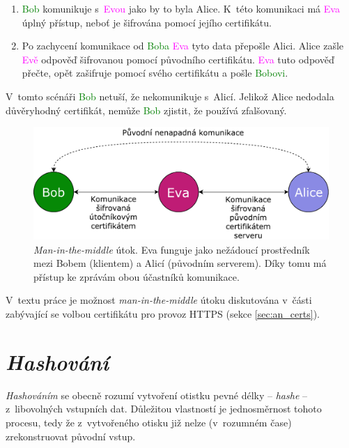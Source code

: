 \begin{enumerate}
    \item \textcolor{green}{Bob} komunikuje s~\textcolor{magenta}{Evou} jako by to byla \textcolor{blue2}{Alice}. K~této komunikaci má \textcolor{magenta}{Eva} úplný přístup, neboť je šifrována pomocí jejího certifikátu.
    \item Po zachycení komunikace od \textcolor{green}{Boba} \textcolor{magenta}{Eva} tyto data přepošle \textcolor{blue2}{Alici}. \textcolor{blue2}{Alice} zašle \textcolor{magenta}{Evě} odpověď šifrovanou pomocí původního certifikátu. \textcolor{magenta}{Eva} tuto odpověď přečte, opět zašifruje pomocí svého certifikátu a pošle \textcolor{green}{Bobovi}.
\end{enumerate}

V~tomto scénáři \textcolor{green}{Bob} netuší, že nekomunikuje s~\textcolor{blue2}{Alicí}. Jelikož \textcolor{blue2}{Alice} nedodala důvěryhodný certifikát, nemůže \textcolor{green}{Bob} zjistit, že používá zfalšovaný.

\begin{figure}[h!]
    \centering
    \includegraphics[width=\textwidth]{images/mitm.pdf}
    \caption[\textit{Man-in-the-middle} útok]{\textit{Man-in-the-middle} útok. Eva funguje jako nežádoucí prostředník mezi Bobem (klientem) a Alicí (původním serverem). Díky tomu má přístup ke zprávám obou účastníků komunikace. \cite{mitm}}
    \label{fig:mitm}
\end{figure}

V~textu práce je možnost \textit{man-in-the-middle} útoku diskutována v~části zabývající se volbou certifikátu pro provoz HTTPS (sekce \ref{sec:an_certs}).

\section{\textit{Hashování}}

\textit{Hashováním} se obecně rozumí vytvoření otistku pevné délky -- \textit{hashe} -- z~libovolných vstupních dat. Důležitou vlastností je jednosměrnost tohoto procesu, tedy že z~vytvořeného otisku již nelze (v~rozumném čase) zrekonstruovat původní vstup. \cite{hash_crackstation}

